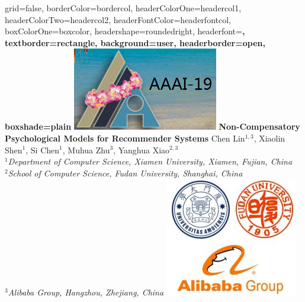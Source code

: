 \documentclass[a0paper,portrait]{baposter}
\begin{document}
\begin{poster}{
grid=false,
borderColor=bordercol, %
headerColorOne=headercol1, %
headerColorTwo=headercol2, %
headerFontColor=headerfontcol, %
boxColorOne=boxcolor, %
headershape=roundedright, %
headerfont=\Large\sf\bf, %
textborder=rectangle,
background=user,
headerborder=open, %
boxshade=plain
}
{\includegraphics[scale=0.8]{AAAI19.png}}
%
%
{ \bf  \huge {Non-Compensatory Psychological Models for Recommender Systems} } %
{\vspace{-0.1em} \smaller Chen Lin$^{1,3}$, Xiaolin Shen$^1$, Si Chen$^1$, Muhua Zhu$^3$, Yanghua Xiao$^{2,3}$   \\  %
\smaller $^1$\it {Department of Computer Science, Xiamen University, Xiamen, Fujian, China} \\
$^2$\it{School of Computer Science, Fudan University, Shanghai, China }\\
$^3$\it{Alibaba Group, Hangzhou, Zhejiang, China} }
{\includegraphics[scale=0.55]{Logo.jpg}}


\end{poster}
\end{document}
